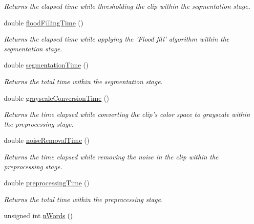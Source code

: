 \begin{CompactItemize}
\begin{CompactList}\small\item\em Returns the elapsed time while thresholding the clip within the segmentation stage. \item\end{CompactList}\item 
\hypertarget{class_statistics_857b7d9a3aa2e5bd61cd8dc8a21fe7e5}{
double \hyperlink{class_statistics_857b7d9a3aa2e5bd61cd8dc8a21fe7e5}{floodFillingTime} ()}
\label{class_statistics_857b7d9a3aa2e5bd61cd8dc8a21fe7e5}

\begin{CompactList}\small\item\em Returns the elapsed time while applying the 'Flood fill' algorithm within the segmentation stage. \item\end{CompactList}\item 
double \hyperlink{class_statistics_d0df3ef2d73687b6dc3f85a55439ae16}{segmentationTime} ()
\begin{CompactList}\small\item\em Returns the total time within the segmentation stage. \item\end{CompactList}\item 
\hypertarget{class_statistics_9880f8dca1fbc0a57dcd967585edc648}{
double \hyperlink{class_statistics_9880f8dca1fbc0a57dcd967585edc648}{grayscaleConversionTime} ()}
\label{class_statistics_9880f8dca1fbc0a57dcd967585edc648}

\begin{CompactList}\small\item\em Returns the time elapsed while converting the clip's color space to grayscale within the preprocessing stage. \item\end{CompactList}\item 
\hypertarget{class_statistics_cb001651c079af004e27458cd61b9c7a}{
double \hyperlink{class_statistics_cb001651c079af004e27458cd61b9c7a}{noiseRemovalTime} ()}
\label{class_statistics_cb001651c079af004e27458cd61b9c7a}

\begin{CompactList}\small\item\em Returns the time elapsed while removing the noise in the clip within the preprocessing stage. \item\end{CompactList}\item 
double \hyperlink{class_statistics_8d7ab1f44a9fb5fe74f2713dbf5e62cd}{preprocessingTime} ()
\begin{CompactList}\small\item\em Returns the total time within the preprocessing stage. \item\end{CompactList}\item 
\hypertarget{class_statistics_f93af7412b6a9025e6fc0f54fc1e3be7}{
unsigned int \hyperlink{class_statistics_f93af7412b6a9025e6fc0f54fc1e3be7}{nWords} ()}
\label{class_statistics_f93af7412b6a9025e6fc0f54fc1e3be7}


\end{CompactItemize}
